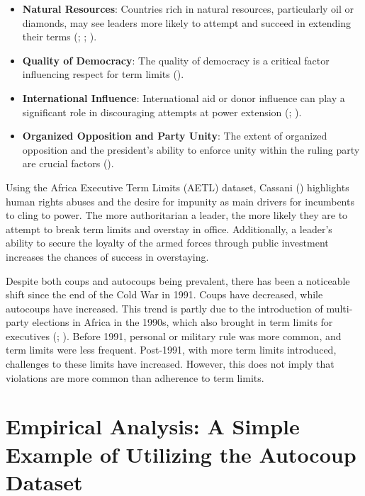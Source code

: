 \documentclass[
  12pt,
]{report}
\begin{document}
\begin{itemize}
\item
  \textbf{Natural Resources}: Countries rich in natural resources,
  particularly oil or diamonds, may see leaders more likely to attempt
  and succeed in extending their terms (; ;
  ).
\item
  \textbf{Quality of Democracy}: The quality of democracy is a critical
  factor influencing respect for term limits
  ().
\item
  \textbf{International Influence}: International aid or donor influence
  can play a significant role in discouraging attempts at power
  extension (;
  ).
\item
  \textbf{Organized Opposition and Party Unity}: The extent of organized
  opposition and the president's ability to enforce unity within the
  ruling party are crucial factors
  ().
\end{itemize}

Using the Africa Executive Term Limits (AETL) dataset, Cassani
() highlights human rights abuses and
the desire for impunity as main drivers for incumbents to cling to
power. The more authoritarian a leader, the more likely they are to
attempt to break term limits and overstay in office. Additionally, a
leader's ability to secure the loyalty of the armed forces through
public investment increases the chances of success in overstaying.

Despite both coups and autocoups being prevalent, there has been a
noticeable shift since the end of the Cold War in 1991. Coups have
decreased, while autocoups have increased. This trend is partly due to
the introduction of multi-party elections in Africa in the 1990s, which
also brought in term limits for executives
(;
). Before 1991, personal or
military rule was more common, and term limits were less frequent.
Post-1991, with more term limits introduced, challenges to these limits
have increased. However, this does not imply that violations are more
common than adherence to term limits.

\section{Empirical Analysis: A Simple Example of Utilizing the Autocoup
Dataset}\label{empirical-analysis-a-simple-example-of-utilizing-the-autocoup-dataset}
\end{document}
